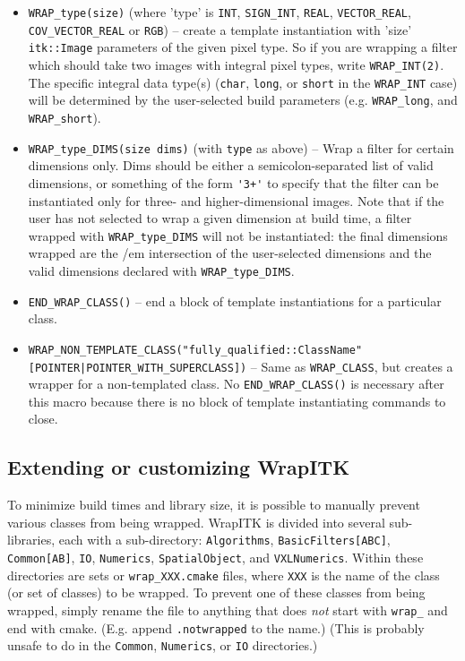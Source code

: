 \documentclass{InsightArticle}
\begin{document}
\begin{itemize}
  \item \verb$WRAP_type(size)$ (where 'type' is \verb$INT$, \verb$SIGN_INT$, \verb$REAL$, \verb$VECTOR_REAL$,
\verb$COV_VECTOR_REAL$ or \verb$RGB$) -- create a template instantiation with 'size'
\verb$itk::Image$ parameters of the given pixel type. So if you are wrapping a filter
which should take two images with integral pixel types, write \verb$WRAP_INT(2)$. The
specific integral data type(s) (\verb$char$, \verb$long$, or \verb$short$ in the \verb$WRAP_INT$ case) will
be determined by the user-selected build parameters (e.g. \verb$WRAP_long$, and
\verb$WRAP_short$). 

  \item \verb$WRAP_type_DIMS(size dims)$ (with \verb$type$ as above) -- Wrap a filter for certain
dimensions only. Dims should be either a semicolon-separated list of valid
dimensions, or something of the form \verb$'3+'$ to specify that the filter can be
instantiated only for three- and higher-dimensional images. Note that if the
user has not selected to wrap a given dimension at build time, a filter wrapped
with \verb$WRAP_type_DIMS$ will not be instantiated: the final dimensions wrapped are
the {/em intersection} of the user-selected dimensions and the valid dimensions
declared with \verb$WRAP_type_DIMS$.

  \item \verb$END_WRAP_CLASS()$ -- end a block of template instantiations for a particular
class.

  \item \verb$WRAP_NON_TEMPLATE_CLASS("fully_qualified::ClassName" [POINTER|POINTER_WITH_SUPERCLASS])$
 -- Same as \verb$WRAP_CLASS$, but creates a wrapper
for a non-templated class. No \verb$END_WRAP_CLASS()$ is necessary after this macro
because there is no block of template instantiating commands to close.
\end{itemize}


  \subsection{Extending or customizing WrapITK}

To minimize build times and library size, it is possible to manually prevent
various classes from being wrapped. WrapITK is divided into several
sub-libraries, each with a sub-directory: \verb$Algorithms$, \verb$BasicFilters[ABC]$,
\verb$Common[AB]$, \verb$IO$, \verb$Numerics$, \verb$SpatialObject$, and \verb$VXLNumerics$. Within these
directories are sets or \verb$wrap_XXX.cmake$ files, where \verb$XXX$ is the name of the class
(or set of classes) to be wrapped. To prevent one of these classes from being
wrapped, simply rename the file to anything that does {\em not} start with \verb$wrap_$ and
end with cmake. (E.g. append \verb$.notwrapped$ to the name.) (This is probably
unsafe to do in the \verb$Common$, \verb$Numerics$, or \verb$IO$ directories.)
\end{document}
